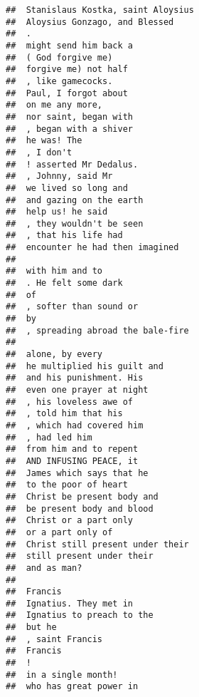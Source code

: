 \documentclass[]{article}
\begin{document}
\begin{verbatim}
##  Stanislaus Kostka, saint Aloysius       
##  Aloysius Gonzago, and Blessed           
##  .                                       
##  might send him back a                   
##  ( God forgive me)                       
##  forgive me) not half                    
##  , like gamecocks.                       
##  Paul, I forgot about                    
##  on me any more,                         
##  nor saint, began with                   
##  , began with a shiver                   
##  he was! The                             
##  , I don't                               
##  ! asserted Mr Dedalus.                  
##  , Johnny, said Mr                       
##  we lived so long and                    
##  and gazing on the earth                 
##  help us! he said                        
##  , they wouldn't be seen                 
##  , that his life had                     
##  encounter he had then imagined          
##                                          
##  with him and to                         
##  . He felt some dark                     
##  of                                      
##  , softer than sound or                  
##  by                                      
##  , spreading abroad the bale-fire        
##                                          
##  alone, by every                         
##  he multiplied his guilt and             
##  and his punishment. His                 
##  even one prayer at night                
##  , his loveless awe of                   
##  , told him that his                     
##  , which had covered him                 
##  , had led him                           
##  from him and to repent                  
##  AND INFUSING PEACE, it                  
##  James which says that he                
##  to the poor of heart                    
##  Christ be present body and              
##  be present body and blood               
##  Christ or a part only                   
##  or a part only of                       
##  Christ still present under their        
##  still present under their               
##  and as man?                             
##                                          
##  Francis                                 
##  Ignatius. They met in                   
##  Ignatius to preach to the               
##  but he                                  
##  , saint Francis                         
##  Francis                                 
##  !                                       
##  in a single month!                      
##  who has great power in                  

\end{verbatim}
\end{document}
